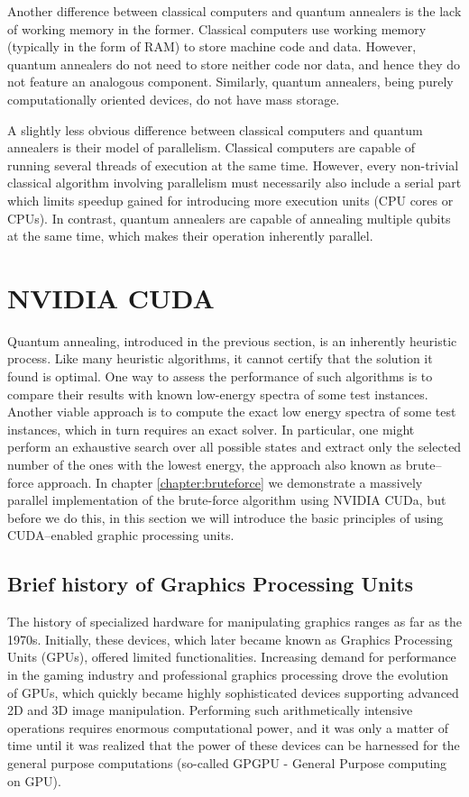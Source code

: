 Another difference between classical computers and quantum annealers is the lack of working memory in the former. Classical computers use working memory (typically in the form of RAM) to store machine code and data. However, quantum annealers do not need to store neither code nor data, and hence they do not feature an analogous component. Similarly, quantum annealers, being purely computationally oriented devices, do not have mass storage.

A slightly less obvious difference between classical computers and quantum annealers is their model
of parallelism. Classical computers are capable of running several threads of execution at the same
time. However, every non-trivial classical algorithm involving parallelism must necessarily also
include a serial part which limits speedup gained for introducing more execution units (CPU cores or
CPUs). In contrast, quantum annealers are capable of annealing multiple qubits at the same time,
which makes their operation inherently parallel.

\section{NVIDIA CUDA}

Quantum annealing, introduced in the previous section, is an inherently heuristic process. Like many
heuristic algorithms, it cannot certify that the solution it found is optimal. One way to assess the
performance of such algorithms is to compare their results with known low-energy spectra of some
test instances. Another viable approach is to compute the exact low energy spectra of some test
instances, which in turn requires an exact solver. In particular, one might perform an exhaustive
search over all possible states and extract only the selected number of the ones with the lowest
energy, the approach also known as brute--force approach. In chapter \ref{chapter:bruteforce} we
demonstrate a massively parallel implementation of the brute-force algorithm using NVIDIA CUDa, but
before we do this, in this section we will introduce the basic principles of using CUDA--enabled
graphic processing units.

\subsection{Brief history of Graphics Processing Units}
The history of specialized hardware for manipulating graphics ranges as far as the 1970s. Initially,
these devices, which later became known as Graphics Processing Units (GPUs), offered limited
functionalities. Increasing demand for performance in the gaming industry and professional graphics
processing drove the evolution of GPUs, which quickly became highly sophisticated devices supporting
advanced 2D and 3D image manipulation. Performing such arithmetically intensive operations requires
enormous computational power, and it was only a matter of time until it was realized that the
power of these devices can be harnessed for the general purpose computations (so-called GPGPU -
General Purpose computing on GPU).

